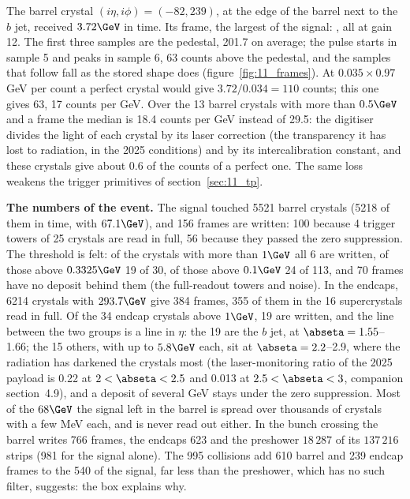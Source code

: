 \begin{plainwords}
The barrel crystal $(i\eta,i\phi)=(-82,239)$, at the edge of the barrel next to the $b$ jet, received $3.72\GeV$ in time.
Its frame, the largest of the signal: , all at gain 12. The first three
samples are the pedestal, 201.7 on average; the pulse starts in sample 5 and peaks in sample 6, 63 counts above the
pedestal, and the samples that follow fall as the stored shape does (figure~\ref{fig:11_frames}). At $0.035\times0.97$
GeV per count a perfect crystal would give $3.72/0.034=110$ counts; this one gives 63, 17 counts per GeV. Over the 13
barrel crystals with more than $0.5\GeV$ and a frame the median is 18.4 counts per GeV instead of 29.5: the digitiser
divides the light of each crystal by its laser correction (the transparency it has lost to radiation, in the 2025
conditions) and by its intercalibration constant, and these crystals give about 0.6 of the counts of a perfect one.
The same loss weakens the trigger primitives of section~\ref{sec:11_tp}.
\end{plainwords}

\textbf{The numbers of the event.} The signal touched 5521 barrel crystals (5218 of them in time, with $67.1\GeV$),
and 156 frames are written: 100 because 4 trigger towers of 25 crystals are read in full, 56 because they passed the
zero suppression. The threshold is felt: of the crystals with more than $1\GeV$ all 6 are written, of those above
$0.3325\GeV$ 19 of 30, of those above $0.1\GeV$ 24 of 113, and 70 frames have no deposit behind them (the full-readout
towers and noise). In the endcaps, 6214 crystals with $293.7\GeV$ give 384 frames, 355 of them in the 16 supercrystals
read in full. Of the 34 endcap crystals above $1\GeV$, 19 are written, and the line between the two groups is a line in
$\eta$: the 19 are the $b$ jet, at $\abseta=1.55$--1.66; the 15 others, with up to $5.8\GeV$ each, sit at
$\abseta=2.2$--2.9, where the radiation has darkened the crystals most (the laser-monitoring ratio of the 2025
payload is 0.22 at $2<\abseta<2.5$ and 0.013 at $2.5<\abseta<3$, companion section~4.9), and a deposit of several GeV
stays under the zero suppression. Most of the $68\GeV$ the signal left in the barrel is spread over
thousands of crystals with a few MeV each, and is never read out either. In the bunch crossing the barrel writes
766 frames, the endcaps 623 and the preshower $18\,287$ of its $137\,216$ strips (981 for the signal alone). The 995
collisions add 610 barrel and 239 endcap frames to the 540 of the signal, far less than the preshower, which has no
such filter, suggests: the box explains why.


